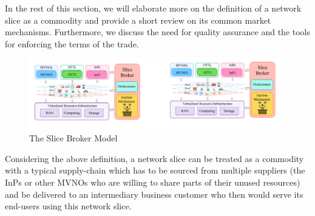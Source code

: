 In the rest of this section, we will elaborate more on the definition of a network slice as a commodity and provide a short review on its common market mechanisms. Furthermore, we discuss the need for quality assurance and the tools for enforcing the terms of the trade. 
\begin{figure}[htbp]
    \centering
    \includegraphics[width=0.9\columnwidth]{Figures/ICC-model.pdf}
    \caption{The Slice Broker Model}
    \label{fig:Slice_broker}
\end{figure}
Considering the above definition, a network slice can be treated as a commodity with a typical supply-chain which has to be sourced from multiple suppliers (the \acp{InP} or other \acp{MVNO} who are willing to share parts of their unused resources) and be delivered to an intermediary business customer who then would serve its end-users using this network slice.

